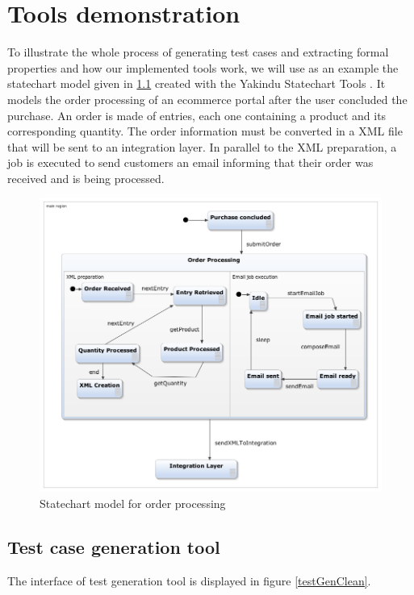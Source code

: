 \chapter{Tools demonstration}
\label{cap:casestudy}

To illustrate the whole process of generating test cases and extracting formal properties and how our implemented tools work, we will use as an example the statechart model given in \ref{webOrderProc} created with the Yakindu Statechart Tools \cite{Yakindu}. It models the order processing of an ecommerce portal after the user concluded the purchase. An order is made of entries, each one containing a product and its corresponding quantity. The order information must be converted in a XML file that will be sent to an integration layer. In parallel to the XML preparation, a job is executed to send customers an email informing that their order was received and is being processed.

\begin{figure}[htb]
\centering
\includegraphics[width=15cm]{figuras/webOrderProc}
\caption{\label{webOrderProc}Statechart model for order processing}
\end{figure}

\section{Test case generation tool}

The interface of test generation tool is displayed in figure \ref{testGenClean}.

